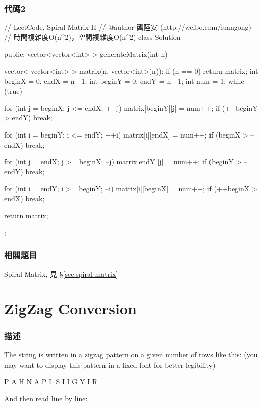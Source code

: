 \subsubsection{代碼2}
\begin{Code}
// LeetCode, Spiral Matrix II
// @author 龔陸安 (http://weibo.com/luangong)
// 時間複雜度O(n^2)，空間複雜度O(n^2)
class Solution {
public:
    vector<vector<int> > generateMatrix(int n) {
        vector< vector<int> > matrix(n, vector<int>(n));
        if (n == 0) return matrix;
        int beginX = 0, endX = n - 1;
        int beginY = 0, endY = n - 1;
        int num = 1;
        while (true) {
            for (int j = beginX; j <= endX; ++j) matrix[beginY][j] = num++;
            if (++beginY > endY) break;

            for (int i = beginY; i <= endY; ++i) matrix[i][endX] = num++;
            if (beginX > --endX) break;

            for (int j = endX; j >= beginX; --j) matrix[endY][j] = num++;
            if (beginY > --endY) break;

            for (int i = endY; i >= beginY; --i) matrix[i][beginX] = num++;
            if (++beginX > endX) break;
        }
        return matrix;
    }
};
\end{Code}


\subsubsection{相關題目}
\begindot
\item Spiral Matrix, 見 \S \ref{sec:spiral-matrix}
\myenddot


\section{ZigZag Conversion} %
\label{sec:zigzag-conversion}


\subsubsection{描述}
The string  is written in a zigzag pattern on a given number of rows like this: (you may want to display this pattern in a fixed font for better legibility)

\begin{Code}
P   A   H   N
A P L S I I G
Y   I   R
\end{Code}

And then read line by line: 

